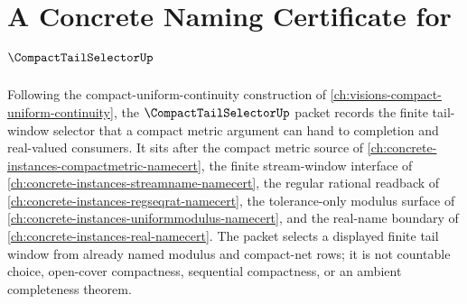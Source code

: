 \chapter{A Concrete Naming Certificate for $\CompactTailSelectorUp$}
\label{ch:concrete-instances-compact-tail-selector-namecert}

Following the compact-uniform-continuity construction of \autoref{ch:visions-compact-uniform-continuity}, the $\CompactTailSelectorUp$ packet records the finite tail-window selector that a compact metric argument can hand to completion and real-valued consumers. It sits after the compact metric source of \autoref{ch:concrete-instances-compactmetric-namecert}, the finite stream-window interface of \autoref{ch:concrete-instances-streamname-namecert}, the regular rational readback of \autoref{ch:concrete-instances-regseqrat-namecert}, the tolerance-only modulus surface of \autoref{ch:concrete-instances-uniformmodulus-namecert}, and the real-name boundary of \autoref{ch:concrete-instances-real-namecert}. The packet selects a displayed finite tail window from already named modulus and compact-net rows; it is not countable choice, open-cover compactness, sequential compactness, or an ambient completeness theorem.

